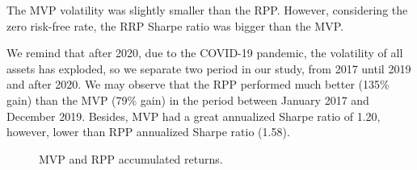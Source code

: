 The MVP volatility was slightly smaller than the RPP. However, considering the zero risk-free rate, the RRP Sharpe ratio was bigger than the MVP.




We remind that after 2020, due to the COVID-19 pandemic, the volatility of all assets has exploded, so we separate two period in our study, from 2017 until 2019 and after 2020. We may observe that the RPP performed much better (135\% gain) than the MVP (79\% gain) in the period between January 2017 and December 2019. Besides, MVP had a great annualized Sharpe ratio of 1.20, however, lower than RPP annualized Sharpe ratio (1.58).



\begin{figure}[H]
	\begin{subfigmatrix}{2}
	\end{subfigmatrix}
	\caption{MVP and RPP accumulated returns.}
	\label{fig:retornoRPPMVP12}
\end{figure}

